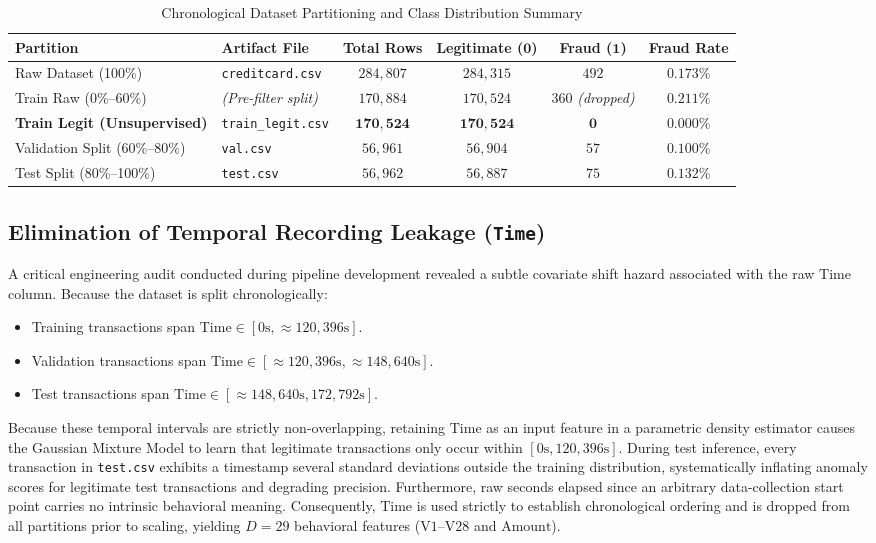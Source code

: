 \documentclass[11pt, a4paper]{article}
\begin{document}
\begin{table}[h!]
\centering
\caption{Chronological Dataset Partitioning and Class Distribution Summary}
\vspace{0.2cm}
\renewcommand{\arraystretch}{1.25}
\begin{tabular}{llcccc}
\toprule
\rowcolor{tableheader}
\textbf{Partition} & \textbf{Artifact File} & \textbf{Total Rows} & \textbf{Legitimate ($\mathbf{0}$)} & \textbf{Fraud ($\mathbf{1}$)} & \textbf{Fraud Rate} \\
\midrule
Raw Dataset (100\%) & \texttt{creditcard.csv} & $284,807$ & $284,315$ & $492$ & $0.173\%$ \\
\rowcolor{rowalt}
Train Raw (0\%--60\%) & \textit{(Pre-filter split)} & $170,884$ & $170,524$ & $360$ \textit{(dropped)} & $0.211\%$ \\
\textbf{Train Legit (Unsupervised)} & \texttt{train\_legit.csv} & $\mathbf{170,524}$ & $\mathbf{170,524}$ & $\mathbf{0}$ & $\mathbf{0.000\%}$ \\
\rowcolor{rowalt}
Validation Split (60\%--80\%) & \texttt{val.csv} & $56,961$ & $56,904$ & $57$ & $0.100\%$ \\
Test Split (80\%--100\%) & \texttt{test.csv} & $56,962$ & $56,887$ & $75$ & $0.132\%$ \\
\bottomrule
\end{tabular}
\label{tab:splits}
\end{table}

\subsection{Elimination of Temporal Recording Leakage (\texttt{Time})}
A critical engineering audit conducted during pipeline development revealed a subtle covariate shift hazard associated with the raw $\text{Time}$ column. Because the dataset is split chronologically:
\begin{itemize}
    \item Training transactions span $\text{Time} \in [0\text{s}, \approx 120,396\text{s}]$.
    \item Validation transactions span $\text{Time} \in [\approx 120,396\text{s}, \approx 148,640\text{s}]$.
    \item Test transactions span $\text{Time} \in [\approx 148,640\text{s}, 172,792\text{s}]$.
\end{itemize}

Because these temporal intervals are strictly non-overlapping, retaining $\text{Time}$ as an input feature in a parametric density estimator causes the Gaussian Mixture Model to learn that legitimate transactions only occur within $[0\text{s}, 120,396\text{s}]$. During test inference, every transaction in \texttt{test.csv} exhibits a timestamp several standard deviations outside the training distribution, systematically inflating anomaly scores for legitimate test transactions and degrading precision. Furthermore, raw seconds elapsed since an arbitrary data-collection start point carries no intrinsic behavioral meaning. Consequently, $\text{Time}$ is used strictly to establish chronological ordering and is dropped from all partitions prior to scaling, yielding $D = 29$ behavioral features ($\text{V1}$--$\text{V28}$ and $\text{Amount}$).
\end{document}
